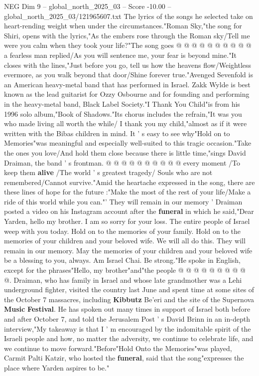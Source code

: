 \begin{textsample}{NEG Dim 9 – global\_north\_2025\_03 – Score -10.00 – global\_north\_2025\_03/121965607.txt}
The lyrics of the songs he selected take on heart-rending weight when under the circumstances."Roman Sky,"the song for Shiri, opens with the lyrics,"As the embers rose through the Roman sky/Tell me were you calm when they took your life?"The song goes @ @ @ @ @ @ @ @ @ @ a fearless man replied/As you will sentence me, your fear is beyond mine."It closes with the lines,"Just before you go, tell us how the heavens flow/Weightless evermore, as you walk beyond that door/Shine forever true."Avenged Sevenfold is an American heavy-metal band that has performed in Israel.
Zakk Wylde is best known as the lead guitarist for Ozzy Osbourne and for founding and performing in the heavy-metal band, Black Label Society."I Thank You Child"is from his 1996 solo album,"Book of Shadows."Its chorus includes the refrain,"It was you who made living all worth the while/ I thank you my child,"almost as if it were written with the Bibas children in mind.
It ' s easy to see why"Hold on to Memories"was meaningful and especially well-suited to this tragic occasion."Take the ones you love/And hold them close because there is little time,"sings David Draiman, the band ' s frontman. @ @ @ @ @ @ @ @ @ @ every moment /To keep them \textbf{alive} /The world ' s greatest tragedy/ Souls who are not remembered/Cannot survive."Amid the heartache expressed in the song, there are these lines of hope for the future :"Make the most of the rest of your life/Make a ride of this world while you can."' They will remain in our memory ' Draiman posted a video on his Instagram account after the \textbf{funeral} in which he said,"Dear Yarden, hello my brother.
I am so sorry for your loss.
The entire people of Israel weep with you today.
Hold on to the memories of your family.
Hold on to the memories of your children and your beloved wife.
We will all do this.
They will remain in our memory.
May the memories of your children and your beloved wife be a blessing to you, always.
Am Israel Chai.
Be strong."He spoke in English, except for the phrases"Hello, my brother"and"the people @ @ @ @ @ @ @ @ @ @.
Draiman, who has family in Israel and whose late grandmother was a Lehi underground fighter, visited the country last June and spent time at some sites of the October 7 massacres, including \textbf{Kibbutz} Be'eri and the site of the Supernova \textbf{Music} \textbf{Festival}.
He has spoken out many times in support of Israel both before and after October 7, and told the Jerusalem Post ' s David Brinn in an in-depth interview,"My takeaway is that I ' m encouraged by the indomitable spirit of the Israeli people and how, no matter the adversity, we continue to celebrate life, and we continue to move forward."Before"Hold Onto the Memories"was played, Carmit Palti Katzir, who hosted the \textbf{funeral}, said that the song"expresses the place where Yarden aspires to be."

\end{textsample}
